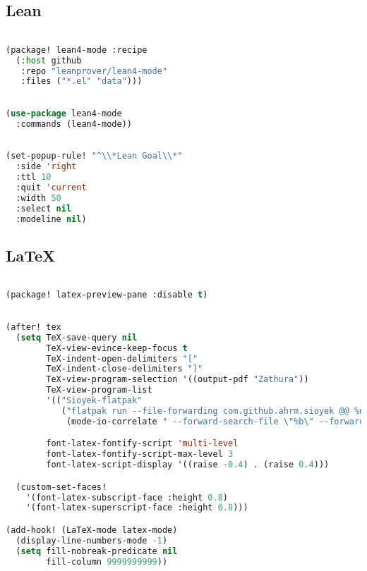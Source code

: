 \documentclass[11pt]{article}
\begin{document}
\subsection{Lean}
\label{sec:lean}
\begin{lstlisting}[language=Lisp]%! Someone please complete this list for me

(package! lean4-mode :recipe
  (:host github
   :repo "leanprover/lean4-mode"
   :files ("*.el" "data")))
\end{lstlisting}

\begin{lstlisting}[language=Lisp]%! Someone please complete this list for me

(use-package lean4-mode
  :commands (lean4-mode))
\end{lstlisting}

\begin{lstlisting}[language=Lisp]%! Someone please complete this list for me

(set-popup-rule! "^\\*Lean Goal\\*"
  :side 'right
  :ttl 10
  :quit 'current
  :width 50
  :select nil
  :modeline nil)
\end{lstlisting}

\subsection{LaTeX}
\label{sec:latex}
\begin{lstlisting}[language=Lisp]%! Someone please complete this list for me

(package! latex-preview-pane :disable t)
\end{lstlisting}

\begin{lstlisting}[language=Lisp]%! Someone please complete this list for me

(after! tex
  (setq TeX-save-query nil
        TeX-view-evince-keep-focus t
        TeX-indent-open-delimiters "["
        TeX-indent-close-delimiters "]"
        TeX-view-program-selection '((output-pdf "Zathura"))
        TeX-view-program-list
        '(("Sioyek-flatpak"
           ("flatpak run --file-forwarding com.github.ahrm.sioyek @@ %o @@"
            (mode-io-correlate " --forward-search-file \"%b\" --forward-search-line %n --inverse-search \"emacsclient -n +%2 %1\""))))

        font-latex-fontify-script 'multi-level
        font-latex-fontify-script-max-level 3
        font-latex-script-display '((raise -0.4) . (raise 0.4)))

  (custom-set-faces!
    '(font-latex-subscript-face :height 0.8)
    '(font-latex-superscript-face :height 0.8)))

(add-hook! (LaTeX-mode latex-mode)
  (display-line-numbers-mode -1)
  (setq fill-nobreak-predicate nil
        fill-column 9999999999))
\end{lstlisting}
\end{document}
